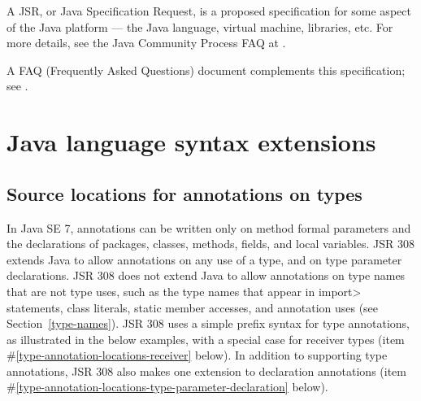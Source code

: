 \documentclass[10pt]{article}
\begin{document}
A JSR, or Java Specification Request, is a proposed specification for some
aspect of the Java platform --- the Java language, virtual machine,
libraries, etc.  For more details, see the Java Community Process FAQ at
.


A FAQ (Frequently Asked Questions) document complements this specification;
see .



\section{Java language syntax extensions\label{syntax}}

\subsection{Source locations for annotations on types\label{type-annotation-locations}}

In Java SE 7, annotations can be written only on method formal parameters
and the declarations of packages, classes, methods, fields, and local variables.
JSR 308 extends Java to allow annotations on any use of a type, and
on type parameter declarations.  JSR 308 does not extend Java to allow
annotations on type names that are not type uses, such as the type names
that appear in \<import> statements, class literals, static member accesses,
and annotation uses (see Section~\ref{type-names}).
JSR 308 uses a simple prefix syntax for type annotations, as illustrated in
the below examples, with a special case
for receiver types (item \#\ref{type-annotation-locations-receiver} below).
In addition to supporting type annotations, JSR 308 also makes one
extension to declaration annotations (item
\#\ref{type-annotation-locations-type-parameter-declaration} below).
\end{document}
